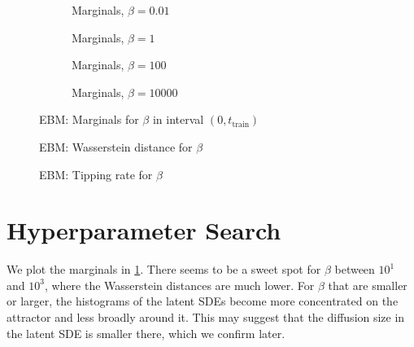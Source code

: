 \documentclass[twoside,11pt]{article}
\begin{document}
\begin{figure}
    \begin{subfigure}{.5\textwidth}
        \centering
        
        \caption{Marginals, \(\beta=0.01\)}
    \end{subfigure}
    \begin{subfigure}{.5\textwidth}
        \centering
        
        \caption{Marginals, \(\beta=1\)}
    \end{subfigure}
    \begin{subfigure}{.5\textwidth}
        \centering
        
        \caption{Marginals, \(\beta=100\)}
    \end{subfigure}
    \begin{subfigure}{.5\textwidth}
        \centering
        
        \caption{Marginals, \(\beta=10000\)}
    \end{subfigure}
    \caption{EBM: Marginals for \(\beta\) in interval \((0, t_{\text{train}})\)}
    \label{fig:first_marginals}
\end{figure}


\begin{figure}
    \begin{center}
    
    \end{center}
    \caption{EBM: Wasserstein distance for \(\beta\)}
    \label{fig:first_wasserstein}
\end{figure}

\begin{figure}
    \begin{center}
    
    \end{center}
    \caption{EBM: Tipping rate for \(\beta\)}
    \label{fig:first_tipping_rate}
\end{figure}

\section{Hyperparameter Search}

We plot the marginals in \cref{fig:first_marginals}. There seems to be a sweet spot for \(\beta\) between \(10^1\) and \(10^3\), where the Wasserstein distances are much lower. For \(\beta\) that are smaller or larger, the histograms of the latent SDEs become more concentrated on the attractor and less broadly around it. This may suggest that the diffusion size in the latent SDE is smaller there, which we confirm later.
\end{document}
